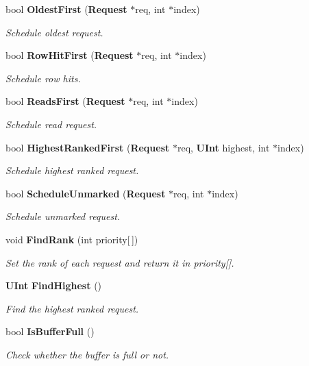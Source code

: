 \begin{CompactItemize}
bool {\bf OldestFirst} ({\bf Request} $\ast$req, int $\ast$index)
\begin{CompactList}\small\item\em Schedule oldest request. \item\end{CompactList}\item 
bool {\bf RowHitFirst} ({\bf Request} $\ast$req, int $\ast$index)
\begin{CompactList}\small\item\em Schedule row hits. \item\end{CompactList}\item 
bool {\bf ReadsFirst} ({\bf Request} $\ast$req, int $\ast$index)
\begin{CompactList}\small\item\em Schedule read request. \item\end{CompactList}\item 
bool {\bf HighestRankedFirst} ({\bf Request} $\ast$req, {\bf UInt} highest, int $\ast$index)
\begin{CompactList}\small\item\em Schedule highest ranked request. \item\end{CompactList}\item 
bool {\bf ScheduleUnmarked} ({\bf Request} $\ast$req, int $\ast$index)
\begin{CompactList}\small\item\em Schedule unmarked request. \item\end{CompactList}\item 
void {\bf FindRank} (int priority[$\,$])
\begin{CompactList}\small\item\em Set the rank of each request and return it in priority[]. \item\end{CompactList}\item 
{\bf UInt} {\bf FindHighest} ()
\begin{CompactList}\small\item\em Find the highest ranked request. \item\end{CompactList}\item 
bool {\bf IsBufferFull} ()
\begin{CompactList}\small\item\em Check whether the buffer is full or not. \item\end{CompactList}\item 

\end{CompactItemize}
